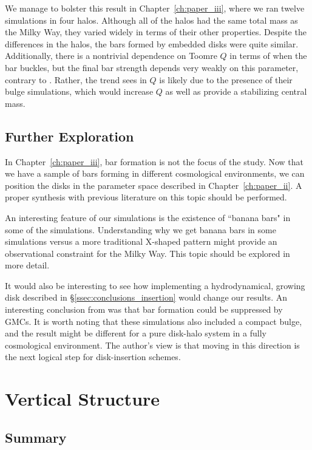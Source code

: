 We manage to bolster this result in Chapter~\ref{ch:paper_iii}, where we ran twelve simulations in four halos. Although all of the halos had the same total mass as the Milky Way, they varied widely in terms of their other properties. Despite the differences in the halos, the bars formed by embedded disks were quite similar. Additionally, there is a nontrivial dependence on Toomre $Q$ in terms of when the bar buckles, but the final bar strength depends very weakly on this parameter, contrary to \citet{YurinSpringelStellarDisks}. Rather, the trend \citet{YurinSpringelStellarDisks} sees in $Q$ is likely due to the presence of their bulge simulations, which would increase $Q$ as well as provide a stabilizing central mass.


\subsection{Further Exploration}


In Chapter~\ref{ch:paper_iii}, bar formation is not the focus of the study. Now that we have a sample of bars forming in different cosmological environments, we can position the disks in the parameter space described in Chapter~\ref{ch:paper_ii}. A proper synthesis with previous literature on this topic should be performed.

An interesting feature of our simulations is the existence of ``banana bars" in some of the simulations. Understanding why we get banana bars in some simulations versus a more traditional X-shaped pattern might provide an observational constraint for the Milky Way. This topic should be explored in more detail.

It would also be interesting to see how implementing a hydrodynamical, growing disk described in \S\ref{ssec:conclusions_insertion} would change our results. An interesting conclusion from \citet{aumer_2016} was that bar formation could be suppressed by GMCs. It is worth noting that these simulations also included a compact bulge, and the result might be different for a pure disk-halo system in a fully cosmological environment. The author's view is that moving in this direction is the next logical step for disk-insertion schemes. 



\section{Vertical Structure}
\subsection{Summary}

